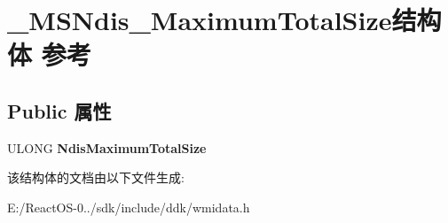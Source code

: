 \hypertarget{struct___m_s_ndis___maximum_total_size}{}\section{\+\_\+\+M\+S\+Ndis\+\_\+\+Maximum\+Total\+Size结构体 参考}
\label{struct___m_s_ndis___maximum_total_size}
\subsection*{Public 属性}
\begin{DoxyCompactItemize}
\item 
\mbox{\label{struct___m_s_ndis___maximum_total_size_ae3f722cdcd5f8d6c508fda00f7a0c8f6}} 
U\+L\+O\+NG {\bfseries Ndis\+Maximum\+Total\+Size}
\end{DoxyCompactItemize}


该结构体的文档由以下文件生成\+:\begin{DoxyCompactItemize}
\item 
E\+:/\+React\+O\+S-\/0../sdk/include/ddk/wmidata.\+h\end{DoxyCompactItemize}
